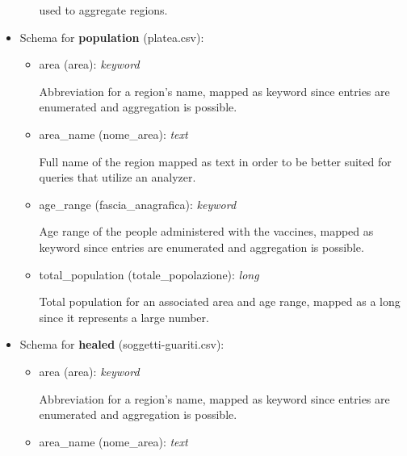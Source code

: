 \documentclass[12pt, a4paper]{article}
\begin{document}
\begin{itemize}
\begin{itemize}
\begin{footnotesize}
          used to aggregate regions.
        \end{footnotesize}
    \end{itemize}
  \item Schema for \textbf{population} (platea.csv):
    \begin{itemize}
      \item area (area): \emph{keyword} \\
        \begin{footnotesize}
          Abbreviation for a region's name, mapped as keyword since entries are 
          enumerated and aggregation is possible.
        \end{footnotesize}
      \item area\_name (nome\_area): \emph{text} \\
        \begin{footnotesize}
          Full name of the region mapped as text in order to be better suited for queries
          that utilize an analyzer.
        \end{footnotesize}
      \item age\_range (fascia\_anagrafica): \emph{keyword} \\
        \begin{footnotesize}
          Age range of the people administered with the vaccines, mapped as keyword since
          entries are enumerated and aggregation is possible.
        \end{footnotesize}
      \item total\_population (totale\_popolazione): \emph{long} \\
        \begin{footnotesize}
          Total population for an associated area and age range, mapped as a long since 
          it represents a large number.
        \end{footnotesize}
    \end{itemize}
  \item Schema for \textbf{healed} (soggetti-guariti.csv):
    \begin{itemize}
      \item area (area): \emph{keyword} \\
        \begin{footnotesize}
          Abbreviation for a region's name, mapped as keyword since entries are 
          enumerated and aggregation is possible.
        \end{footnotesize}
      \item area\_name (nome\_area): \emph{text} \\

\end{itemize}
\end{itemize}
\end{document}
